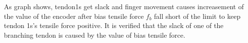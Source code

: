 \documentclass{llncs}
\begin{document}
	As graph shows, tendon1s get slack and finger movement causes increasement of the value of the encoder after bias tensile force $f_b$ fall short of the limit to keep tendon 1s's tensile force positive.
	It is verified that the slack of one of the branching tendon is caused by the value of bias tensile force.

	



\end{document}
